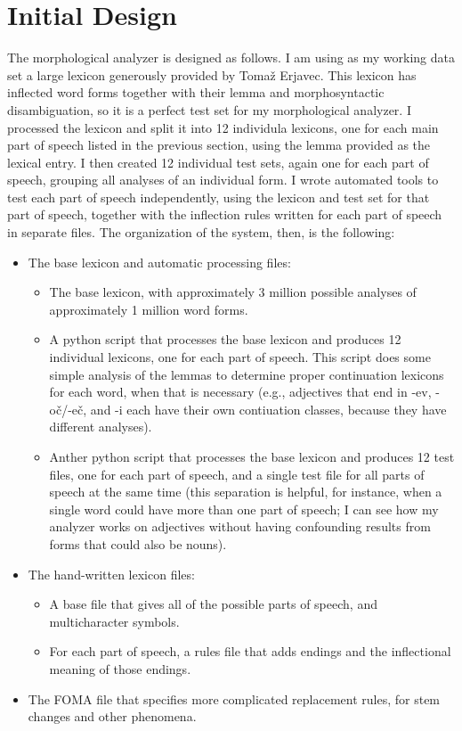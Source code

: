 \documentclass[11pt,letterpaper]{article}
\begin{document}
\section{Initial Design}

The morphological analyzer is designed as follows.  I am using as my working
data set a large lexicon generously provided by Toma\v{z} Erjavec.  This
lexicon has inflected word forms together with their lemma and morphosyntactic
disambiguation, so it is a perfect test set for my morphological analyzer.  I
processed the lexicon and split it into 12 individula lexicons, one for each
main part of speech listed in the previous section, using the lemma provided as
the lexical entry.  I then created 12 individual test sets, again one for each
part of speech, grouping all analyses of an individual form.  I wrote automated
tools to test each part of speech independently, using the lexicon and test set
for that part of speech, together with the inflection rules written for each
part of speech in separate files.  The organization of the system, then, is the
following:

\begin{itemize}
  \item The base lexicon and automatic processing files:
    \begin{itemize}
      \item The base lexicon, with approximately 3 million possible analyses of
        approximately 1 million word forms.
      \item A python script that processes the base lexicon and produces 12
        individual lexicons, one for each part of speech.  This script does
        some simple analysis of the lemmas to determine proper continuation
        lexicons for each word, when that is necessary (e.g., adjectives that
        end in -ev, -o\v{c}/-e\v{c}, and -i each have their own contiuation
        classes, because they have different analyses).
      \item Anther python script that processes the base lexicon and produces
        12 test files, one for each part of speech, and a single test file for
        all parts of speech at the same time (this separation is helpful, for
        instance, when a single word could have more than one part of speech; I
        can see how my analyzer works on adjectives without having confounding
        results from forms that could also be nouns).
    \end{itemize}
  \item The hand-written lexicon files:
    \begin{itemize}
      \item A base file that gives all of the possible parts of speech, and
        multicharacter symbols.
      \item For each part of speech, a rules file that adds endings and the
        inflectional meaning of those endings.
    \end{itemize}
  \item The FOMA file that specifies more complicated replacement rules, for
    stem changes and other phenomena.
\end{itemize}
\end{document}
